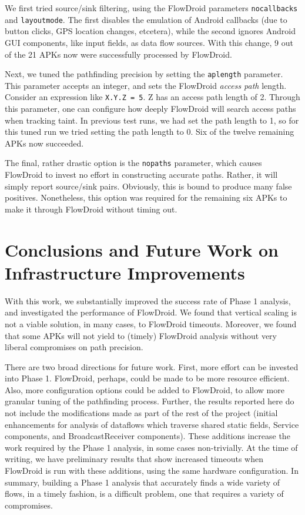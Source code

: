 We first tried source/sink filtering, using the FlowDroid parameters \texttt{nocallbacks} and \texttt{layoutmode}.  The first disables the emulation of Android callbacks (due to button clicks, GPS location changes, etcetera), while the second ignores Android GUI components, like input fields, as data flow sources.  With this change, 9 out of the 21 APKs now were successfully processed by FlowDroid. 

Next, we tuned the pathfinding precision by setting the \texttt{aplength} parameter.  This parameter accepts an integer, and sets the FlowDroid \emph{access path} length.  Consider an expression like \texttt{X.Y.Z = 5}.  Z has an access path length of 2.  Through this parameter, one can configure how deeply FlowDroid will search access paths when tracking taint.  In previous test runs, we had set the path length to 1, so for this tuned run we tried setting the path length to 0.  Six of the twelve remaining APKs now succeeded. 

The final, rather drastic option is the \texttt{nopaths} parameter, which causes FlowDroid to invest no effort in constructing accurate paths.  Rather, it will simply report source/sink pairs.  Obviously, this is bound to produce many false positives.  Nonetheless, this option was required for the remaining six APKs to make it through FlowDroid without timing out.
\section{Conclusions and Future Work on Infrastructure Improvements}
With this work, we substantially improved the success rate of Phase 1 analysis, and investigated the performance of FlowDroid.  We found that vertical scaling is not a viable solution, in many cases, to FlowDroid timeouts.  Moreover, we found that some APKs will not yield to (timely) FlowDroid analysis without very liberal compromises on path precision.

There are two broad directions for future work.  First, more effort can be invested into Phase 1.  FlowDroid, perhaps, could be made to be more resource efficient.  Also, more configuration options could be added to FlowDroid, to allow more granular tuning of the pathfinding process.  Further, the results reported here do not include the modifications made as part of the rest of the project (initial enhancements for analysis of dataflows which traverse shared static fields, Service components, and BroadcastReceiver components).  These additions increase the work required by the Phase 1 analysis, in some cases non-trivially.  At the time of writing, we have preliminary results that show increased timeouts when FlowDroid is run with these additions, using the same hardware configuration.  In summary, building a Phase 1 analysis that accurately finds a wide variety of flows, in a timely fashion, is a difficult problem, one that requires a variety of compromises. 

